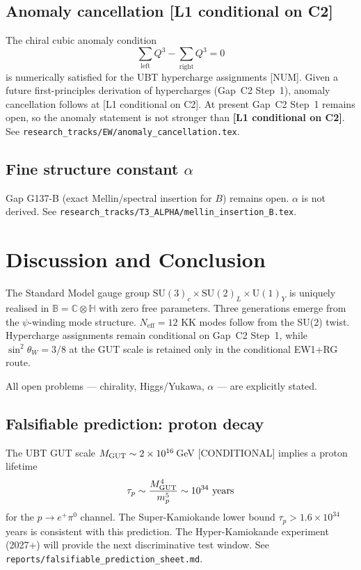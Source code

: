 \documentclass[12pt,a4paper]{article}
\theoremstyle{definition}
\theoremstyle{remark}
\newcommand{\SU}[1]{\mathrm{SU}(#1)}
\newcommand{\UU}[1]{\mathrm{U}(#1)}
\newcommand{\Bq}{\mathbb{C}\otimes\mathbb{H}}
\begin{document}
\subsection*{Anomaly cancellation [L1 conditional on C2]}
The chiral cubic anomaly condition
\[
\sum_{\mathrm{left}} Q^3-\sum_{\mathrm{right}} Q^3=0
\]
is numerically satisfied for the UBT hypercharge assignments [NUM].
Given a future first-principles derivation of hypercharges (Gap~C2 Step~1),
anomaly cancellation follows at [L1 conditional on C2].
At present Gap~C2 Step~1 remains open, so the anomaly statement is not stronger
than \textbf{[L1 conditional on C2]}.
See \texttt{research\_tracks/EW/anomaly\_cancellation.tex}.

\subsection*{Fine structure constant $\alpha$}

Gap G137-B (exact Mellin/spectral insertion for $B$) remains open.
$\alpha$ is not derived.
See \texttt{research\_tracks/T3\_ALPHA/mellin\_insertion\_B.tex}.

\section{Discussion and Conclusion}
\label{sec:conclusion}

The Standard Model gauge group $\SU{3}_c\times\SU{2}_L\times\UU{1}_Y$
is uniquely realised in $\mathbb{B} = \Bq$ with zero free parameters.
Three generations emerge from the $\psi$-winding mode structure.
$N_{\mathrm{eff}} = 12$ KK modes follow from the SU(2) twist.
Hypercharge assignments remain conditional on Gap~C2 Step~1, while
$\sin^2\theta_W = 3/8$ at the GUT scale is retained only in the
conditional EW1+RG route.

All open problems — chirality, Higgs/Yukawa,
$\alpha$ — are explicitly stated.

\subsection*{Falsifiable prediction: proton decay}
The UBT GUT scale $M_{\rm GUT}\sim 2\times 10^{16}$\,GeV [CONDITIONAL]
implies a proton lifetime
\[
\tau_p \sim \frac{M_{\rm GUT}^4}{m_p^5}\sim 10^{34}\ \text{years}
\]
for the $p\to e^+\pi^0$ channel.
The Super-Kamiokande lower bound $\tau_p > 1.6\times 10^{34}$\,years
is consistent with this prediction.
The Hyper-Kamiokande experiment (2027+) will provide the
next discriminative test window.
See \texttt{reports/falsifiable\_prediction\_sheet.md}.
\end{document}
